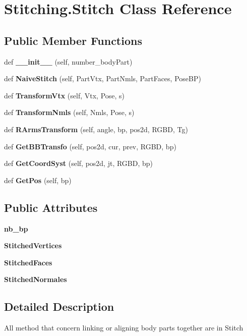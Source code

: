 \section{Stitching.\+Stitch Class Reference}
\label{class_stitching_1_1_stitch}
\subsection*{Public Member Functions}
\begin{DoxyCompactItemize}
\item 
def \textbf{ \+\_\+\+\_\+init\+\_\+\+\_\+} (self, number\+\_\+body\+Part)
\item 
def \textbf{ Naive\+Stitch} (self, Part\+Vtx, Part\+Nmls, Part\+Faces, Pose\+BP)
\item 
def \textbf{ Transform\+Vtx} (self, Vtx, Pose, s)
\item 
def \textbf{ Transform\+Nmls} (self, Nmls, Pose, s)
\item 
def \textbf{ R\+Arms\+Transform} (self, angle, bp, pos2d, R\+G\+BD, Tg)
\item 
def \textbf{ Get\+B\+B\+Transfo} (self, pos2d, cur, prev, R\+G\+BD, bp)
\item 
def \textbf{ Get\+Coord\+Syst} (self, pos2d, jt, R\+G\+BD, bp)
\item 
def \textbf{ Get\+Pos} (self, bp)
\end{DoxyCompactItemize}
\subsection*{Public Attributes}
\begin{DoxyCompactItemize}
\item 
\mbox{\label{class_stitching_1_1_stitch_a6984b78515332ecfd8c9bfd783f91e49}} 
{\bfseries nb\+\_\+bp}
\item 
\mbox{\label{class_stitching_1_1_stitch_a4de61586c9c27338b95e1a0ccefc3c34}} 
{\bfseries Stitched\+Vertices}
\item 
\mbox{\label{class_stitching_1_1_stitch_ad76a66008928b460d7c1b7e82972cbeb}} 
{\bfseries Stitched\+Faces}
\item 
\mbox{\label{class_stitching_1_1_stitch_a4744a49d727d4966433272eb4f721560}} 
{\bfseries Stitched\+Normales}
\end{DoxyCompactItemize}


\subsection{Detailed Description}
\begin{DoxyVerb}All method that concern linking or aligning body parts together are in Stitch
\end{DoxyVerb}
 

